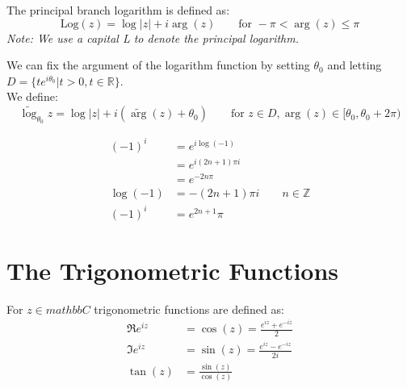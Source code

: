 \begin{definition}
    The principal branch logarithm is defined as:
    \[
        \text{Log}(z) = \log |z| + i \arg(z) \qquad \text{for } -\pi < \arg(z) \leq \pi
    \]
    \textit{Note: We use a capital L to denote the principal logarithm.}
\end{definition}

\begin{definition}
    We can fix the argument of the logarithm function by setting \(\theta_0\) and letting $D = \{ te^{i\theta_0} | t > 0, t \in \mathbb{R} \}$.\\
    We define:
    \[
        \widetilde{\log}_{\theta_0} z = \log |z| + i \left( \widetilde{\arg}(z) + \theta_0 \right) \qquad \text{for } z \in D, \arg(z) \in [\theta_0, \theta_0 + 2\pi)
    \]
\end{definition}

\begin{example}
    \begin{align}
        (-1)^i   & = e^{i \log(-1)}                         \\
                 & = e^{i (2n + 1)\pi i}                    \\
                 & = e^{-2n\pi}                             \\
        \log(-1) & = -(2n + 1)\pi i \qquad n \in \mathbb{Z} \\
        (-1)^i   & = e^{2n + 1}\pi
    \end{align}
\end{example}

\section{The Trigonometric Functions}
\begin{definition}
    For $z \in mathbb{C}$ trigonometric functions are defined as:
    \begin{align}
        \Re{e^{iz}} & = \cos(z)  = \frac{e^{iz} + e^{-iz}}{2}  \\
        \Im{e^{iz}} & = \sin(z)  = \frac{e^{iz} - e^{-iz}}{2i} \\
        \tan(z)     & = \frac{\sin(z)}{\cos(z)}                \\
    \end{align}
\end{definition}

